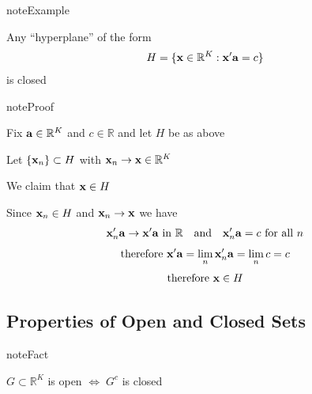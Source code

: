\documentclass[letterpaper,10pt,english]{jupyterBook}
\begin{document}
\begin{sphinxadmonition}{note}{Example}

\sphinxAtStartPar
Any “hyperplane” of the form
\begin{equation*}
\begin{split}
%
H = \{ {\bf x} \in \mathbb{R}^K : {\bf x}' {\bf a} = c \}
%
\end{split}
\end{equation*}
\sphinxAtStartPar
is closed
\end{sphinxadmonition}

\begin{sphinxadmonition}{note}{Proof}

\sphinxAtStartPar
Fix \({\bf a} \in \mathbb{R}^K\) and \(c \in \mathbb{R}\) and let \(H\) be as above

\sphinxAtStartPar
Let \(\{{\bf x}_n\} \subset H\) with \({\bf x}_n \to {\bf x} \in \mathbb{R}^K\)

\sphinxAtStartPar
We claim that \({\bf x} \in H\)

\sphinxAtStartPar
Since \({\bf x}_n \in H\) and \({\bf x}_n \to {\bf x}\) we have
\begin{equation*}
\begin{split}
%
{\bf x}_n ' {\bf a} \to {\bf x}' {\bf a} \text{ in } \mathbb{R}
\quad \text{and} \quad
{\bf x}_n' {\bf a} = c \text{ for all } n
%
\end{split}
\end{equation*}\begin{equation*}
\begin{split}
%
\text{therefore } 
{\bf x}' {\bf a} = \lim_{n} {\bf x}_n' {\bf a} 
= \lim_n c
= c
%
\end{split}
\end{equation*}\begin{equation*}
\begin{split}
%
\text{therefore } 
{\bf x} \in H
%
\end{split}
\end{equation*}\end{sphinxadmonition}


\subsection{Properties of Open and Closed Sets}
\label{\detokenize{06.optimization_fundamentals:properties-of-open-and-closed-sets}}
\begin{sphinxadmonition}{note}{Fact}

\sphinxAtStartPar
\(G \subset \mathbb{R}^K\) is open \(\iff \; G^c\) is closed
\end{sphinxadmonition}
\end{document}
